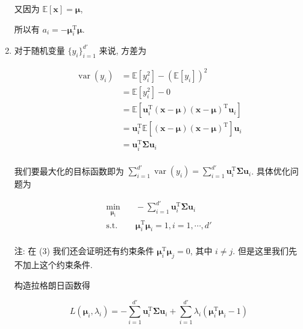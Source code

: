 \documentclass[answers]{exam}  %
\begin{document}
\begin{questions}
\begin{solution}
\begin{enumerate}
            又因为 $\mathbb{E}[\bm{x}] = \bm{\mu}$,

            所以有 $a_i = -\bm{\mu}_i^{\mathrm{T}}\bm{\mu}$.

      \item

            对于随机变量 $\{ y_i \}_{i=1}^{d'}$ 来说, 方差为

            $$
              \begin{aligned}
                \operatorname{var}(y_i) & = \mathbb{E}[y_i^{2}] - (\mathbb{E}[y_i])^{2}                                                  \\
                                        & = \mathbb{E}[y_i^{2}] - 0                                                                      \\
                                        & = \mathbb{E}[\bm{u}_i^{\mathrm{T}}(\bm{x} - \bm{\mu})(\bm{x} - \bm{\mu})^{\mathrm{T}}\bm{u}_i] \\
                                        & = \bm{u}_i^{\mathrm{T}}\mathbb{E}[(\bm{x} - \bm{\mu})(\bm{x} - \bm{\mu})^{\mathrm{T}}]\bm{u}_i \\
                                        & = \bm{u}_i^{\mathrm{T}}\bm{\Sigma}\bm{u}_i                                                     \\
              \end{aligned}
            $$

            我们要最大化的目标函数即为 $\displaystyle \sum_{i=1}^{d'}\operatorname{var}(y_i) = \sum_{i=1}^{d'}\bm{u}_i^{\mathrm{T}}\bm{\Sigma}\bm{u}_i$. 具体优化问题为

            $$
              \begin{aligned}
                \min_{\bm{\mu}_i} & \quad -\sum_{i=1}^{d'}\bm{u}_i^{\mathrm{T}}\bm{\Sigma}\bm{u}_i \\
                \text{s.t.}       & \quad \bm{\mu}_i^{\mathrm{T}}\bm{\mu}_i = 1, i = 1, \cdots, d' \\
              \end{aligned}
            $$

            注: 在 (3) 我们还会证明还有约束条件 $\bm{\mu}_i^{\mathrm{T}}\bm{\mu}_j = 0$, 其中 $i \neq j$. 但是这里我们先不加上这个约束条件.

            构造拉格朗日函数得

            $$
              L(\bm{\mu}_i, \lambda_i) = -\sum_{i=1}^{d'}\bm{u}_i^{\mathrm{T}}\bm{\Sigma}\bm{u}_i + \sum_{i=1}^{d'}\lambda_i(\bm{\mu}_i^{\mathrm{T}}\bm{\mu}_i - 1)
            $$


\end{enumerate}
\end{solution}
\end{questions}
\end{document}

